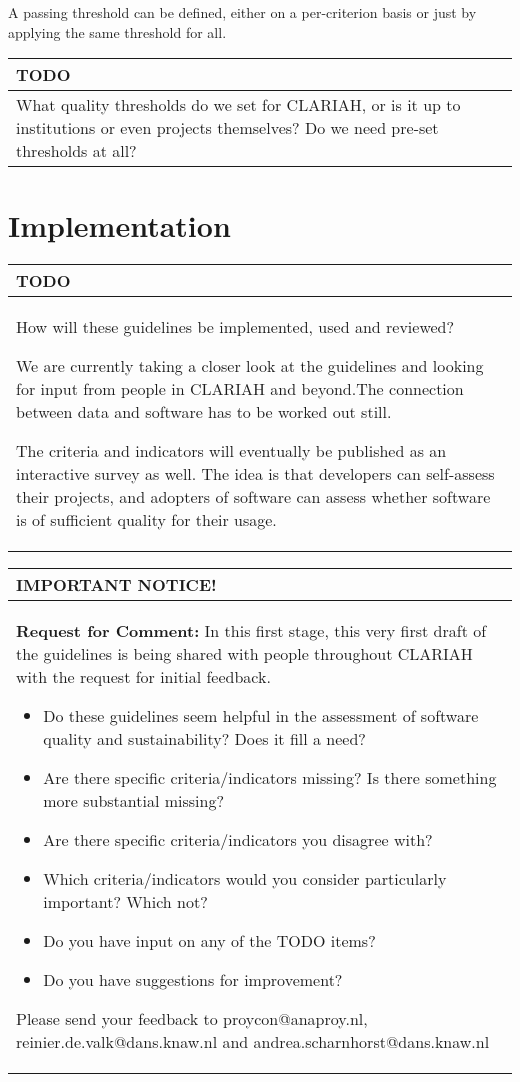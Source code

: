 \documentclass[a4paper,11pt]{article}
\newenvironment{notice}{
\begin{center}
    \begin{tabular}[h!]{|p{0.8\textwidth}|}
    \hline
    {\bf IMPORTANT NOTICE!}\\\hline}
{   \\\hline
    \end{tabular}
\end{center}}
\newenvironment{TODO}{
\begin{center}
    \begin{tabular}[h!]{|p{0.8\textwidth}|}
    \hline
    {\bf TODO}\\\hline}
{   \\\hline
    \end{tabular}
\end{center}}
\begin{document}
A passing threshold can be defined, either on a per-criterion basis or just
by applying the same threshold for all. 

\begin{TODO}
What quality thresholds do we set for CLARIAH, or is it up
to institutions or even projects themselves? Do we need pre-set thresholds at
all?
\end{TODO}



\section{Implementation}

\begin{TODO}
How will these guidelines be implemented, used and reviewed?

We are currently taking a closer look at the guidelines and looking for input
from people in CLARIAH and beyond.The connection between data and software has
to be worked out still.

The criteria and indicators will eventually be published as an interactive
survey as well. The idea is that developers can self-assess their projects, and
adopters of software can assess whether software is of sufficient quality for
their usage.
\end{TODO}

\begin{notice}
\textbf{Request for Comment:} In this first stage, this very first draft of the guidelines is being shared with
people throughout CLARIAH with the request for initial feedback. 
\begin{itemize}
    \item Do these guidelines seem helpful in the assessment of software
        quality and sustainability? Does it fill a need?
    \item Are there specific criteria/indicators missing? Is there something more substantial missing?
    \item Are there specific criteria/indicators you disagree with?
    \item Which criteria/indicators would you consider particularly important?  Which not?
    \item Do you have input on any of the TODO items?
    \item Do you have suggestions for improvement?
\end{itemize}

Please send your feedback to proycon@anaproy.nl, reinier.de.valk@dans.knaw.nl and andrea.scharnhorst@dans.knaw.nl
\end{notice}
\end{document}
